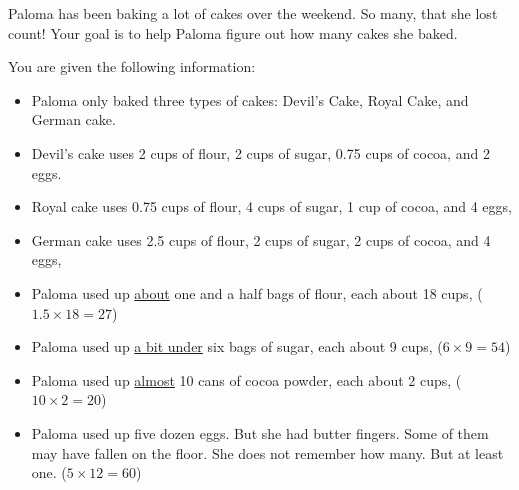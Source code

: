 \documentclass[addpoints]{exam}
\begin{document}
\begin{questions}
\question Paloma has been baking a lot of cakes over the weekend. So many, that she lost count! Your goal is to help Paloma figure out how many cakes she baked.

You are given the following information:
\begin{itemize}
\item Paloma only baked three types of cakes: Devil's Cake, Royal Cake, and German cake.
\item Devil's cake uses 2 cups of flour, 2 cups of sugar, 0.75 cups of cocoa, and 2 eggs.
\item Royal cake uses 0.75 cups of flour, 4 cups of sugar, 1 cup of cocoa, and 4 eggs,
\item German cake uses 2.5 cups of flour, 2 cups of sugar, 2 cups of cocoa, and 4 eggs,
\item Paloma used up \underline{about} one and a half bags of flour, each about 18 cups, ($1.5\times 18 = 27$)
\item Paloma used up \underline{a bit under} six bags of sugar, each about 9 cups, ($6\times 9 = 54$)
\item Paloma used up \underline{almost} 10 cans of cocoa powder, each about 2 cups, ($10\times 2 = 20$)
\item Paloma used up five dozen eggs. But she had butter fingers. Some of them may have fallen on the floor. She does not remember how many. But at least one. ($5\times 12 = 60$)
\end{itemize}
\end{questions}
\end{document}

